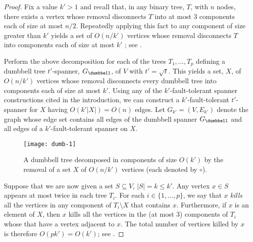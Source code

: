 \documentclass[final]{siamltex}
\begin{document}
\begin{proof} 
  Fix a value $k'>1$ and recall that, in any binary tree, $T$, with $n$
  nodes, there exists a vertex whose removal disconnects $T$ into at most
  3 components each of size at most $n/2$.  Repeatedly applying this fact
  to any component of size greater than $k'$ yields a set of $O(n/k')$
  vertices whose removal disconnects $T$ into components each of size
  at most $k'$ \cite[Lemma~12.1.5]{ns07}; see .

  Perform the above decomposition for each of the trees $T_1,\ldots,T_p$
  defining a dumbbell tree $t'$-spanner, $G_\dumbbell$, of $V$ with
  $t'=\sqrt{t}$.  This yields a set, $X$, of $O(n/k')$ vertices
  whose removal disconnects every dumbbell tree into components
  each of size at most $k'$.  Using any of the $k'$-fault-tolerant
  spanner constructions cited in the introduction, we can construct a
  $k'$-fault-tolerant $t'$-spanner for $X$ having $O(k'|X|)=O(n)$ edges.
  Let $G_{k'}=(V,E_{k'})$ denote the graph whose edge set contains
  all edges of the dumbbell spanner $G_\dumbbell$ and all edges of a
  $k'$-fault-tolerant spanner on $X$.

  \begin{figure}
    \begin{center}
      \texttt{[image: dumb-1]}
    \end{center}
    \caption{A dumbbell tree decomposed in components of size $O(k')$
    by the removal of a set $X$ of $O(n/k')$ vertices (each denoted
    by $\circ$).}
  \end{figure}

  Suppose that we are now given a set $S\subseteq V$, $|S|=k\le k'$.
  Any vertex $x\in S$ appears at most twice in each tree $T_i$.  For each
  $i\in\{1,\ldots,p\}$, we say that $x$ \emph{kills} all the vertices
  in any component of $T_i\setminus X$ that contains $x$.  Furthermore,
  if $x$ is an element of $X$, then $x$ kills all the vertices in the (at
  most 3) components of $T_i$ whose that have a vertex adjacent to $x$.
  The total number of vertices killed by $x$ is therefore $O(pk')=O(k')$;
  see .


\end{proof}
\end{document}
